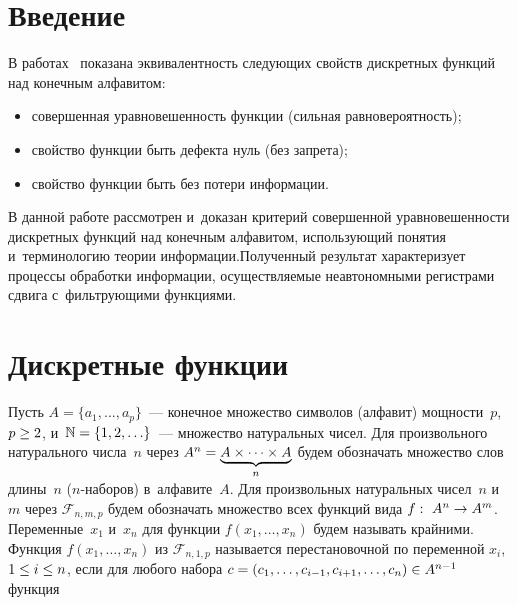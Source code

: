 \begin{multicols}{2}

\label{st\stat}

\section{Введение}

В работах~\cite{Sumarokov,Hedlund} показана эквивалентность сле\-ду\-ющих свойств 
дискретных функций над конечным алфавитом:
\begin{itemize}
    \item совершенная уравновешенность функции (сильная равновероятность);
    \item свойство функции быть дефекта нуль (без запрета);
    \item свойство функции быть без потери информации.
\end{itemize}

В данной работе рассмотрен и~доказан критерий совершенной уравновешенности 
дискретных функций над конечным алфавитом, ис\-поль\-зу\-ющий понятия и~терминологию 
теории информации.\linebreak Получен\-ный результат характеризует процессы обработки 
информации, осуществляемые неавтономными регистрами сдвига с~фильтрующими 
функциями.

\vspace*{-4pt}


\section{Дискретные функции} %

\vspace*{-2pt}

Пусть $A=\{a_1,\ldots,a_p\}$~--- конечное множество символов (алфавит) мощности~$p$, 
$p \hm\geq 2$, и~$\mathbb{N}\hm=\{1,2,\ldots\}$~--- множество натуральных чисел. 
Для произвольного натурального числа~$n$ через $A^n \hm= \underbrace{A \times \dots 
\times A}_n$ будем обозначать множество слов длины~$n$ ($n$-на\-бо\-ров) в~алфавите~$A$. 
Для произвольных натуральных чисел~$n$ и~$m$ через $\mathcal{F}_{n, m, p}$ 
будем обозначать множество всех функций вида $f:~A^n \hm\rightarrow A^m$.  
Переменные~$x_1$ и~$x_n$ для функции $f(x_1, \dots, x_n)$ будем называть 
крайними. Функция $f(x_1,\dots,x_n)$ из  $\mathcal{F}_{n, 1, p}$ называется 
перестановочной по переменной $x_i$, $1 \hm\leq i \hm\leq n$, если для любого набора $c 
\hm= (c_1, \dots, c_{i-1}, c_{i+1}, \dots, c_n) \in A^{n-1}$ функция


\end{multicols}
